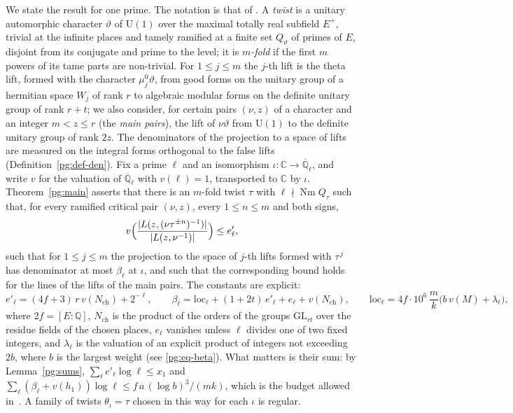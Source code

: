 \documentclass[10pt]{amsart}
\theoremstyle{definition}
\theoremstyle{remark}
\begin{document}
We state the result for one prime. The notation is that of
{\cite[\S\S14.1--14.10]{P46}}. A \emph{twist} is a unitary automorphic character
$\vartheta$ of $\mathrm U(1)$ over the maximal totally real subfield $E^+$, trivial at the
infinite places and tamely ramified at a finite set $Q_\vartheta$ of primes of $E$, disjoint
from its conjugate and prime to the level; it is \emph{$m$-fold} if the first $m$ powers of its
tame parts are non-trivial. For $1\le j\le m$ the $j$-th lift is the theta lift, formed with the
character $\mu_j^0\vartheta$, from good forms on the unitary group of a hermitian space $W_j$ of
rank $r$ to algebraic modular forms on the definite unitary group of rank $r+t$; we also
consider, for certain pairs $(\nu,z)$ of a character and an integer $m<z\le r$ (the \emph{main
pairs}), the lift of $\nu\vartheta$ from $\mathrm U(1)$ to the definite unitary group of rank
$2z$. The denominators of the projection to a space of lifts are measured on the integral forms
orthogonal to the false lifts (Definition~\ref{pg:def-den}). Fix a prime $\ell$ and an isomorphism
$\iota\colon\mathbb C\to\overline{\mathbb Q}_\ell$, and write $v$ for the valuation of
$\overline{\mathbb Q}_\ell$ with $v(\ell)=1$, transported to $\mathbb C$ by $\iota$.
Theorem~\ref{pg:main} asserts that there is an $m$-fold twist $\tau$ with
$\ell\nmid\operatorname{Nm}Q_\tau$ such that, for every ramified critical pair $(\nu,z)$, every
$1\le n\le m$ and both signs,
\[
v\Bigl(\frac{|L(z,(\nu\tau^{\pm n})^{-1})|}{|L(z,\nu^{-1})|}\Bigr)\le e'_\ell ,
\]
such that for $1\le j\le m$ the projection to the space of $j$-th lifts formed with $\tau^{\,j}$
has denominator at most $\beta_\ell$ at $\iota$, and such that the corresponding bound holds for
the lines of the lifts of the main pairs. The constants are explicit:
\[
e'_\ell=(4f+3)\,r\,v(N_{\mathrm{ch}})+2^{-\ell},\qquad
\beta_\ell=\mathrm{loc}_\ell+(1+2t)\,e'_\ell+e_\ell+v(N_{\mathrm{ch}}),\qquad
\mathrm{loc}_\ell=4f\cdot10^6\,\frac mk\bigl(b\,v(M)+\lambda_\ell\bigr),
\]
where $2f=[E:\mathbb Q]$, $N_{\mathrm{ch}}$ is the product of the orders of the groups
$\mathrm{GL}_{rt}$ over the residue fields of the chosen places, $e_\ell$ vanishes unless
$\ell$ divides one of two fixed integers, and
$\lambda_\ell$ is the valuation of an explicit product of integers not exceeding $2b$, where $b$
is the largest weight (see \eqref{pg:eq-beta}). What matters is their sum: by Lemma~\ref{pg:sums},
$\sum_\ell e'_\ell\log\ell\le x_1$ and $\sum_\ell(\beta_\ell+v(h_1))\log\ell\le
f\,a\,(\log b)^3/(mk)$, which is the budget allowed in~\cite{P46}. A family of twists
$\theta_\iota=\tau$ chosen in this way for each $\iota$ is regular.
\end{document}
